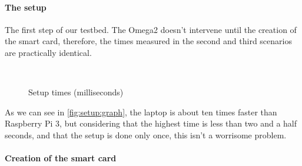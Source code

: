 \documentclass[journal]{IEEEtran}
\begin{document}
\paragraph{The setup}\hfil

The first step of our testbed. The Omega2 doesn't intervene until the creation of the smart card, therefore, the times measured in the second and third scenarios are practically identical.

\begin{figure}[bth]
	\myfloatalign
	 \quad
	 \\
	\caption{Setup times (milliseconds)}
	\label{fig:setup:graph}
\end{figure}

As we can see in \autoref{fig:setup:graph}, the laptop is about ten times faster than Raspberry Pi 3, but considering that the highest time is less than two and a half seconds, and that the setup is done only once, this isn't a worrisome problem.

\paragraph{Creation of the smart card}\hfil
\end{document}
